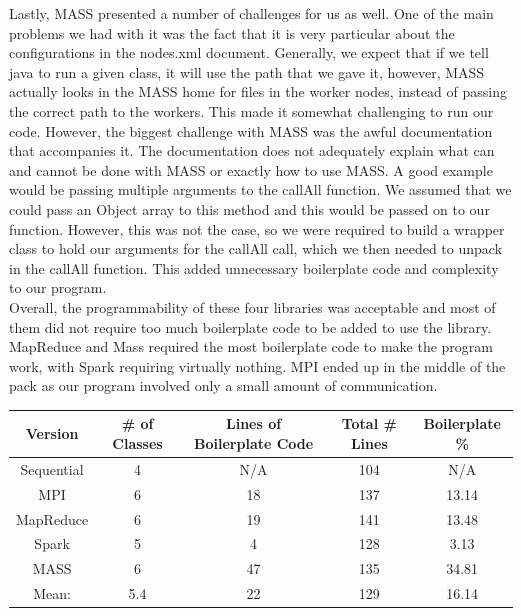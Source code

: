 \documentclass{article}
\begin{document}
			Lastly, MASS presented a number of challenges for us as well. One of the main problems we had with it was the fact that it is very particular about the configurations in the nodes.xml document. Generally, we expect that if we tell java to run a given class, it will use the path that we gave it, however, MASS actually looks in the MASS home for files in the worker nodes, instead of passing the correct path to the workers. This made it somewhat challenging to run our code. However, the biggest challenge with MASS was the awful documentation that accompanies it. The documentation does not adequately explain what can and cannot be done with MASS or exactly how to use MASS. A good example would be passing multiple arguments to the callAll function. We assumed that we could pass an Object array to this method and this would be passed on to our function. However, this was not the case, so we were required to build a wrapper class to hold our arguments for the callAll call, which we then needed to unpack in the callAll function. This added unnecessary boilerplate code and complexity to our program. \\
			 
			Overall, the programmability of these four libraries was acceptable and most of them did not require too much boilerplate code to be added to use the library. MapReduce and Mass required the most boilerplate code to make the program work, with Spark requiring virtually nothing. MPI ended up in the middle of the pack as our program involved only a small amount of communication. \\
		
        		\begin{minipage}{\linewidth}
                    \centering
        			\begin{tabular}{c|cccc}\label{T6}
        				Version 	& \# of Classes & Lines of Boilerplate Code & Total \# Lines & Boilerplate \%\\
        				\hline
        				Sequential	& 4		& N/A	& 104 	& N/A 	\\
        				MPI			& 6		& 18	& 137 	& 13.14 \\
        				MapReduce	& 6		& 19	& 141	& 13.48	\\
        				Spark		& 5		& 4		& 128	&  3.13	\\
        				MASS		& 6		& 47	& 135	& 34.81	\\
        				\hline
        				Mean: 		& 5.4	& 22	& 129	& 16.14	\\
        			\end{tabular}
        		\smallskip\smallskip\smallskip\smallskip
                \end{minipage}
\end{document}
